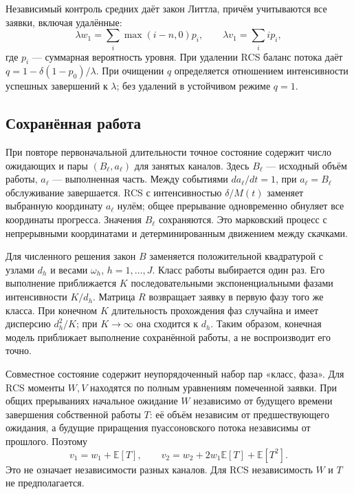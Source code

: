 \documentclass[a4paper,12pt]{article}
\begin{document}
Независимый контроль средних даёт закон Литтла, причём учитываются все заявки, включая удалённые:
\[
\lambda w_1=\sum_i\max(i-n,0)p_i,\qquad
\lambda v_1=\sum_i i p_i,
\]
где \(p_i\) --- суммарная вероятность уровня. При удалении RCS баланс потока даёт \(q=1-\delta(1-p_0)/\lambda\). При очищении \(q\) определяется отношением интенсивности успешных завершений к \(\lambda\); без удалений в устойчивом режиме \(q=1\).

\subsection{Сохранённая работа}
При повторе первоначальной длительности точное состояние содержит число ожидающих и пары \((B_\ell,a_\ell)\) для занятых каналов. Здесь \(B_\ell\) --- исходный объём работы, \(a_\ell\) --- выполненная часть. Между событиями \(da_\ell/dt=1\), при \(a_\ell=B_\ell\) обслуживание завершается. RCS с интенсивностью \(\delta/M(t)\) заменяет выбранную координату \(a_\ell\) нулём; общее прерывание одновременно обнуляет все координаты прогресса. Значения \(B_\ell\) сохраняются. Это марковский процесс с непрерывными координатами и детерминированным движением между скачками.

Для численного решения закон \(B\) заменяется положительной квадратурой с узлами \(d_h\) и весами \(\omega_h\), \(h=1,\ldots,J\). Класс работы выбирается один раз. Его выполнение приближается \(K\) последовательными экспоненциальными фазами интенсивности \(K/d_h\). Матрица \(R\) возвращает заявку в первую фазу того же класса. При конечном \(K\) длительность прохождения фаз случайна и имеет дисперсию \(d_h^2/K\); при \(K\to\infty\) она сходится к \(d_h\). Таким образом, конечная модель приближает выполнение сохранённой работы, а не воспроизводит его точно.

Совместное состояние содержит неупорядоченный набор пар «класс, фаза». Для RCS моменты \(W,V\) находятся по полным уравнениям помеченной заявки. При общих прерываниях начальное ожидание \(W\) независимо от будущего времени завершения собственной работы \(T\): её объём независим от предшествующего ожидания, а будущие приращения пуассоновского потока независимы от прошлого. Поэтому
\[
v_1=w_1+\mathbb E[T],\qquad
v_2=w_2+2w_1\mathbb E[T]+\mathbb E[T^2].
\]
Это не означает независимости разных каналов. Для RCS независимость \(W\) и \(T\) не предполагается.
\end{document}
